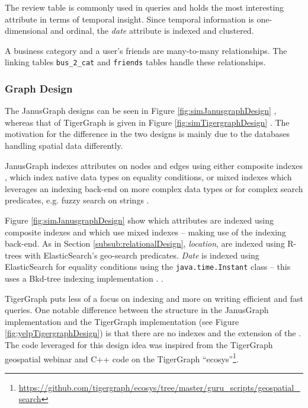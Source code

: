 The review table is commonly used in queries and holds the most interesting attribute in terms of temporal insight. Since temporal information is one-dimensional and ordinal, the \emph{date} attribute is indexed and clustered.

A business category and a user's friends are many-to-many relationships. The linking tables \texttt{bus\_2\_cat} and \texttt{friends} tables handle these relationships.

\subsubsection{Graph Design}

The JanusGraph designs  can be seen in Figure \ref{fig:simJanusgraphDesign} , whereas that of TigerGraph is given in Figure \ref{fig:simTigergraphDesign} . The motivation for the difference in the two designs is mainly due to the databases handling spatial data differently.

JanusGraph indexes attributes on nodes and edges using either composite indexes \cite{janusgraphCompIndex}, which index native data types on equality conditions, or mixed indexes which leverages an indexing back-end on more complex data types or for complex search predicates, e.g. fuzzy search on strings \cite{janusgraphMixedIndex}.

Figure \ref{fig:simJanusgraphDesign}  show which attributes are indexed using composite indexes and which use mixed indexes -- making use of the indexing back-end. As in Section \ref{subsub:relationalDesign}, \emph{location},  are indexed using R-trees with ElasticSearch's geo-search predicates. \emph{Date} is indexed using ElasticSearch for equality conditions using the \texttt{java.time.Instant} class -- this uses a Bkd-tree indexing implementation \cite{esBkdtreeIndex}. .

TigerGraph puts less of a focus on indexing and more on writing efficient and fast queries. One notable difference between the structure in the JanusGraph implementation and the TigerGraph implementation (see Figure \ref{fig:yelpTigergraphDesign}) is that there are no indexes and the extension of the . The code leveraged for this design idea was inspired from the TigerGraph geospatial webinar \cite{graphGurus} and C++ code on the TigerGraph ``ecosys''\footnote{\url{https://github.com/tigergraph/ecosys/tree/master/guru\_scripts/geospatial\_search}}.
